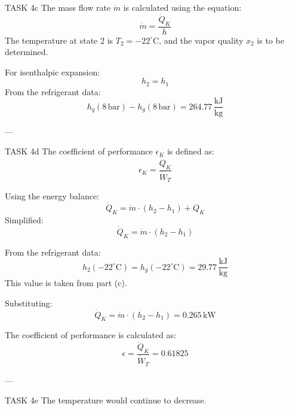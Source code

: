 TASK 4c  
The mass flow rate \( \dot{m} \) is calculated using the equation:  
\[
\dot{m} = \frac{\dot{Q}_K}{h}
\]  
The temperature at state 2 is \( T_2 = -22^\circ\text{C} \), and the vapor quality \( x_2 \) is to be determined.  

For isenthalpic expansion:  
\[
h_2 = h_1
\]  
From the refrigerant data:  
\[
h_q(8 \, \text{bar}) - h_g(8 \, \text{bar}) = 264.77 \, \frac{\text{kJ}}{\text{kg}}
\]  

---

TASK 4d  
The coefficient of performance \( \epsilon_K \) is defined as:  
\[
\epsilon_K = \frac{\dot{Q}_K}{\dot{W}_T}
\]  

Using the energy balance:  
\[
\dot{Q}_K = \dot{m} \cdot (h_2 - h_1) + Q_K
\]  
Simplified:  
\[
\dot{Q}_K = \dot{m} \cdot (h_2 - h_1)
\]  

From the refrigerant data:  
\[
h_2(-22^\circ\text{C}) = h_g(-22^\circ\text{C}) = 29.77 \, \frac{\text{kJ}}{\text{kg}}
\]  
This value is taken from part (c).  

Substituting:  
\[
\dot{Q}_K = \dot{m} \cdot (h_2 - h_1) = 0.265 \, \text{kW}
\]  

The coefficient of performance is calculated as:  
\[
\epsilon = \frac{\dot{Q}_K}{\dot{W}_T} = 0.61825
\]  

---

TASK 4e  
The temperature would continue to decrease.